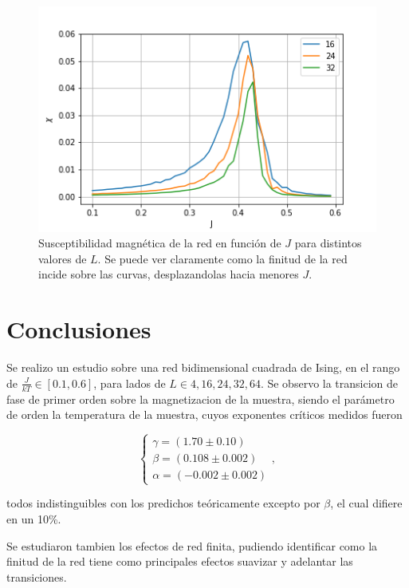 \documentclass[%
 reprint,
 amsmath,amssymb,
 aps,
]{revtex4-1}
\begin{document}
\begin{figure}
  \includegraphics[width=1.0\columnwidth]{images/chi_vs_l.png}
  \caption{Susceptibilidad magn\'etica de la red en funci\'on de $J$ para distintos valores de $L$. Se puede ver claramente como la finitud de la red incide sobre las curvas, desplazandolas hacia menores $J$.}
  \label{chi_vs_l}
\end{figure}

\section{\label{conclusions}Conclusiones}

Se realizo un estudio sobre una red bidimensional cuadrada de Ising, en el rango
de $\frac{J}{kT} \in [0.1, 0.6]$, para lados de $L \in {4, 16, 24, 32, 64}$. Se
observo la transicion de fase de primer orden sobre la magnetizacion de la
muestra, siendo el par\'ametro de orden la temperatura de la muestra, cuyos
exponentes cr\'iticos medidos fueron

$$
\left \{
  \begin{matrix}
    \gamma = (1.70 \pm 0.10) \\
    \beta = (0.108 \pm 0.002) \\
    \alpha = (-0.002 \pm 0.002)
  \end{matrix}
\right. ,
$$

todos indistinguibles con los predichos te\'oricamente excepto por $\beta$, el cual difiere en un 10\%.

Se estudiaron tambien los efectos de red finita, pudiendo identificar como la
finitud de la red tiene como principales efectos suavizar y adelantar las
transiciones.

\appendix

\end{document}
